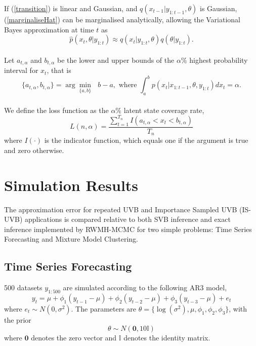 \documentclass[12pt,a4paper]{article}\usepackage[]{graphicx}\usepackage[]{color}
\begin{document}
If (\ref{transition}) is linear and Gaussian, and  $q(x_{t-1} | y_{1:t-1}, \theta)$ is Gaussian, (\ref{marginaliseHat}) can be marginalised analytically, allowing the Variational Bayes approximation at time $t$ as
\begin{equation}
\label{UVBfilter}
\hat{p}(x_t, \theta | y_{1:t}) \approx q(x_{t} | y_{1:t}, \theta)q(\theta|y_{1:t}).
\end{equation}
\\

Let $a_{t, \alpha}$ and $b_{t, \alpha}$ be the lower and upper bounds of the $\alpha\%$ highest probability interval for $x_t$, that is
\begin{equation}
\label{HPI}
\{a_{t, \alpha}, b_{t, \alpha}\} = \arg \underset{\{a, b\}}{\min}\mbox{ } b - a, \mbox{ where } \int_a^b p(x_t | x_{1:t-1}, \theta, y_{1:t})dx_t = \alpha.
\end{equation}
\\

We define the loss function as the $\alpha\%$ latent state coverage rate, 
\begin{equation}
\label{coverage}
L(n, \alpha) = \frac{\sum_{t=1}^{T_n} I(a_{t, \alpha} < x_t < b_{t, \alpha})}{T_n}
\end{equation}
where $I(\cdot)$ is the indicator function, which equals one if the argument is true and zero otherwise.
\fi

\section{Simulation Results}
\label{sec:UVBSim}

The approximation error for repeated UVB and Importance Sampled UVB (IS-UVB) applications is compared relative to both SVB inference and exact inference implemented by RWMH-MCMC for two simple problems: Time Series Forecasting and Mixture Model Clustering.

\subsection{Time Series Forecasting}
\label{subsec:UVBTS}

500 datasets $y_{1:500}$ are simulated according to the following AR3 model,
\begin{equation}
\label{UVB:TSAR3}
y_t = \mu + \phi_1 (y_{t-1} - \mu) + \phi_2 (y_{t-2} - \mu) + \phi_3 (y_{t-3} - \mu) + e_t
\end{equation}
where $e_t \sim N(0, \sigma^2)$. 
The parameters are $\theta = \{\log(\sigma^2), \mu, \phi_1, \phi_2, \phi_3 \}$, with the prior
\begin{equation}
\label{UVB:TSprior}
\theta \sim N(\boldsymbol{0}, 10 \mathbb{I})
\end{equation}
where $\boldsymbol{0}$ denotes the zero vector and $\mathbb{I}$ denotes the identity matrix.
\\
\end{document}
